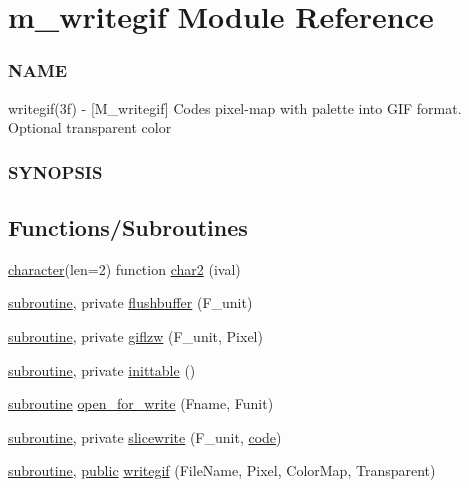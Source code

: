 \hypertarget{namespacem__writegif}{}\section{m\+\_\+writegif Module Reference}
\label{namespacem__writegif}


\subsubsection*{N\+A\+ME}

writegif(3f) -\/ \mbox{[}M\+\_\+writegif\mbox{]} Codes pixel-\/map with palette into G\+IF format. Optional transparent color \subsubsection*{S\+Y\+N\+O\+P\+S\+IS} 


\subsection*{Functions/\+Subroutines}
\begin{DoxyCompactItemize}
\item 
\hyperlink{option__stopwatch_83_8txt_abd4b21fbbd175834027b5224bfe97e66}{character}(len=2) function \hyperlink{namespacem__writegif_a79ebbfd4c7df8520a82c75c3a62f0c96}{char2} (ival)
\item 
\hyperlink{M__stopwatch_83_8txt_acfbcff50169d691ff02d4a123ed70482}{subroutine}, private \hyperlink{namespacem__writegif_a48c5ca5487be9dbe565c0d4f8aa02d0d}{flushbuffer} (F\+\_\+unit)
\item 
\hyperlink{M__stopwatch_83_8txt_acfbcff50169d691ff02d4a123ed70482}{subroutine}, private \hyperlink{namespacem__writegif_a13c09be69495f4ba21ecb7c134216a17}{giflzw} (F\+\_\+unit, Pixel)
\item 
\hyperlink{M__stopwatch_83_8txt_acfbcff50169d691ff02d4a123ed70482}{subroutine}, private \hyperlink{namespacem__writegif_aed61b15f90188ddf39b71aa0c73a82a8}{inittable} ()
\item 
\hyperlink{M__stopwatch_83_8txt_acfbcff50169d691ff02d4a123ed70482}{subroutine} \hyperlink{namespacem__writegif_adb045213dd61508ad7dc7e5640fde67d}{open\+\_\+for\+\_\+write} (Fname, Funit)
\item 
\hyperlink{M__stopwatch_83_8txt_acfbcff50169d691ff02d4a123ed70482}{subroutine}, private \hyperlink{namespacem__writegif_a27e0ec2c6e05428641179bf35762adb7}{slicewrite} (F\+\_\+unit, \hyperlink{ufpp__overview_81_8txt_a74a0615f2d9c4a398d9126096f8092f8}{code})
\item 
\hyperlink{M__stopwatch_83_8txt_acfbcff50169d691ff02d4a123ed70482}{subroutine}, \hyperlink{M__stopwatch_83_8txt_a2f74811300c361e53b430611a7d1769f}{public} \hyperlink{namespacem__writegif_a02be37849028b2f9484cff1b4285375d}{writegif} (File\+Name, Pixel, Color\+Map, Transparent)
\end{DoxyCompactItemize}
